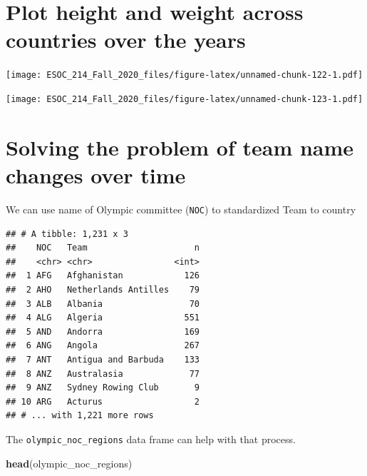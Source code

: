 \documentclass[
]{book}
\newenvironment{Shaded}{\begin{snugshade}}{\end{snugshade}}
\newcommand{\KeywordTok}[1]{\textcolor[rgb]{0.13,0.29,0.53}{\textbf{#1}}}
\newcommand{\NormalTok}[1]{#1}
\newcommand{\OperatorTok}[1]{\textcolor[rgb]{0.81,0.36,0.00}{\textbf{#1}}}
\newcommand{\StringTok}[1]{\textcolor[rgb]{0.31,0.60,0.02}{#1}}
\begin{document}
\hypertarget{plot-height-and-weight-across-countries-over-the-years}{%
\section{Plot height and weight across countries over the years}\label{plot-height-and-weight-across-countries-over-the-years}}

\texttt{[image: ESOC\_214\_Fall\_2020\_files/figure-latex/unnamed-chunk-122-1.pdf]}

\texttt{[image: ESOC\_214\_Fall\_2020\_files/figure-latex/unnamed-chunk-123-1.pdf]}

\hypertarget{solving-the-problem-of-team-name-changes-over-time}{%
\section{Solving the problem of team name changes over time}\label{solving-the-problem-of-team-name-changes-over-time}}

We can use name of Olympic committee (\texttt{NOC}) to standardized Team to country

\begin{Shaded}
\end{Shaded}

\begin{verbatim}
## # A tibble: 1,231 x 3
##    NOC   Team                     n
##    <chr> <chr>                <int>
##  1 AFG   Afghanistan            126
##  2 AHO   Netherlands Antilles    79
##  3 ALB   Albania                 70
##  4 ALG   Algeria                551
##  5 AND   Andorra                169
##  6 ANG   Angola                 267
##  7 ANT   Antigua and Barbuda    133
##  8 ANZ   Australasia             77
##  9 ANZ   Sydney Rowing Club       9
## 10 ARG   Acturus                  2
## # ... with 1,221 more rows
\end{verbatim}

The \texttt{olympic\_noc\_regions} data frame can help with that process.

\begin{Shaded}
\begin{Highlighting}[]
\KeywordTok{head}\NormalTok{(olympic_noc_regions)}
\end{Highlighting}
\end{Shaded}
\end{document}
